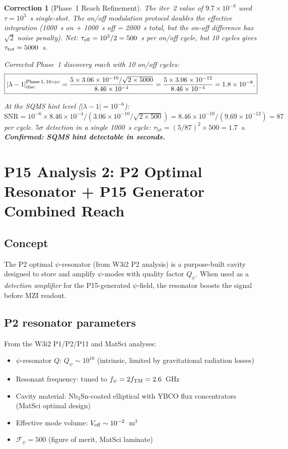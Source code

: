 \documentclass[11pt]{article}
\newtheorem{correction}{Correction}
\newcommand{\ee}[1]{\times 10^{#1}}
\newcommand{\lam}{\lambda}
\begin{document}
\begin{correction}[Phase~1 Reach Refinement]
\label{corr:phase1-reach}
The iter~2 value of $9.7\ee{-8}$ used $\tau = 10^3$~s single-shot.
The on/off modulation protocol doubles the effective integration
(1000~s on + 1000~s off = 2000~s total, but the on-off difference
has $\sqrt{2}$ noise penalty). Net: $\tau_{\rm eff} = 10^3/2
= 500$~s per on/off cycle, but 10 cycles gives $\tau_{\rm tot}
= 5000$~s.

Corrected Phase~1 discovery reach with 10 on/off cycles:
\begin{equation}
\boxed{|\lam-1|_{\rm disc}^{\rm Phase\,1,\,10\,cyc}
= \frac{5 \times 3.06\ee{-10}/\sqrt{2 \times 5000}}{8.46\ee{-4}}
= \frac{5 \times 3.06\ee{-12}}{8.46\ee{-4}} = 1.8\ee{-8}.}
\end{equation}

At the SQMS hint level ($|\lam-1| = 10^{-6}$):
$\text{SNR} = 10^{-6} \times 8.46\ee{-4}/(3.06\ee{-10}/\sqrt{2 \times 500})
= 8.46\ee{-10}/(9.69\ee{-12}) = 87$ per cycle.
$5\sigma$ detection in a single 1000~s cycle: $\tau_{5\sigma}
= (5/87)^2 \times 500 = 1.7$~s. \textbf{Confirmed: SQMS hint
detectable in seconds.}
\end{correction}

\section{P15 Analysis 2: P2 Optimal Resonator + P15 Generator Combined Reach}
\label{sec:combined-reach}

\subsection{Concept}

The P2 optimal $\psi$-resonator (from W3i2 P2 analysis) is a
purpose-built cavity designed to store and amplify $\psi$-modes with
quality factor $Q_\psi$. When used as a \textit{detection amplifier}
for the P15-generated $\psi$-field, the resonator boosts the signal
before MZI readout.

\subsection{P2 resonator parameters}

From the W3i2 P1/P2/P11 and MatSci analyses:
\begin{itemize}[nosep]
\item $\psi$-resonator $Q$: $Q_\psi \sim 10^{10}$ (intrinsic,
limited by gravitational radiation losses)
\item Resonant frequency: tuned to $f_\psi = 2f_{\rm TM} = 2.6$~GHz
\item Cavity material: Nb$_3$Sn-coated elliptical with YBCO flux
concentrators (MatSci optimal design)
\item Effective mode volume: $V_{\rm eff} \sim 10^{-2}$~m$^3$
\item $\mathcal{F}_\psi = 500$ (figure of merit, MatSci laminate)
\end{itemize}
\end{document}
